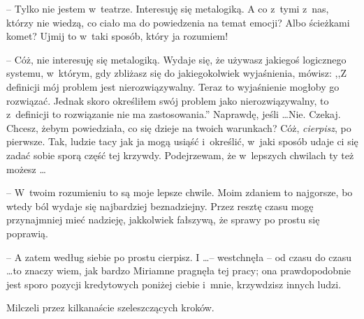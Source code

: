 \documentclass[oneside,polish,11pt,rmheadings]{mwbk}
\begin{document}
-- Tylko nie jestem w~teatrze. Interesuję się metalogiką. A co z~tymi z~nas, którzy nie wiedzą, co ciało ma do powiedzenia na temat emocji? Albo ścieżkami komet? Ujmij to w~taki sposób, który ja rozumiem! 

-- Cóż, nie interesuję się metalogiką. Wydaje się, że używasz jakiegoś logicznego systemu, w~którym, gdy zbliżasz się do jakiegokolwiek wyjaśnienia, mówisz: ,,Z definicji mój problem jest nierozwiązywalny. Teraz to wyjaśnienie mogłoby go rozwiązać. Jednak skoro określiłem swój problem jako nierozwiązywalny, to z~definicji to rozwiązanie nie ma zastosowania.'' Naprawdę, jeśli \ldots  Nie. Czekaj. Chcesz, żebym powiedziała, co się dzieje na twoich warunkach? Cóż, \textit{cierpisz}, po pierwsze. Tak, ludzie tacy jak ja mogą usiąść i~określić, w~jaki sposób udaje ci się zadać sobie sporą część tej krzywdy. Podejrzewam, że w~lepszych chwilach ty też możesz \ldots  

-- W~twoim rozumieniu to są moje lepsze chwile. Moim zdaniem to najgorsze, bo wtedy ból wydaje się najbardziej beznadziejny. Przez resztę czasu mogę przynajmniej mieć nadzieję, jakkolwiek fałszywą, że sprawy po prostu się poprawią. 

-- A zatem według siebie po prostu cierpisz. I \ldots  -- westchnęła -- od czasu do czasu \ldots  to znaczy wiem, jak bardzo Miriamne pragnęła tej pracy; ona prawdopodobnie jest sporo pozycji kredytowych poniżej ciebie i~mnie, krzywdzisz innych ludzi. 

Milczeli przez kilkanaście szeleszczących kroków. 
\end{document}
